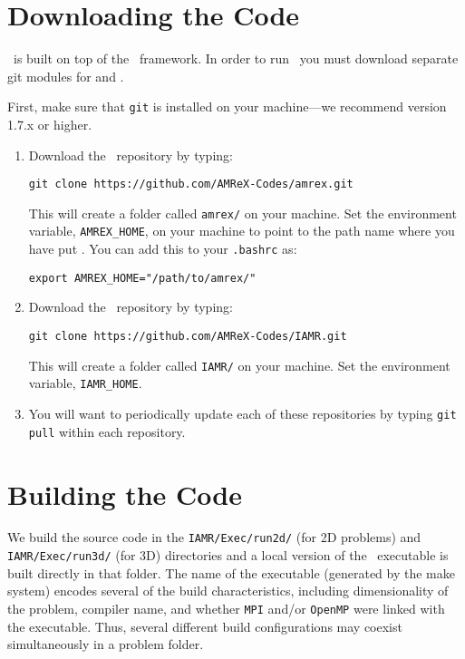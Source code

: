 
\section{Downloading the Code}

\iamr\ is built on top of the \amrex\ framework.  In order to run
\iamr\, you must download separate git modules for \iamr and \amrex.

\vspace{.1in}

\noindent First, make sure that {\tt git} is installed on your machine---we recommend version 1.7.x or higher.

\vspace{.1in}

\begin{enumerate}

\item Download the \amrex\ repository by typing: 
\begin{verbatim}
git clone https://github.com/AMReX-Codes/amrex.git
\end{verbatim}

This will create a folder called {\tt amrex/} on your machine.
Set the environment variable, {\tt AMREX\_HOME}, on your
machine to point to the path name where you have put \amrex.
You can add this to your {\tt .bashrc} as:
\begin{verbatim}
export AMREX_HOME="/path/to/amrex/"
\end{verbatim}

\item Download the \iamr\ repository by typing: 
\begin{verbatim}
git clone https://github.com/AMReX-Codes/IAMR.git
\end{verbatim}

This will create a folder called {\tt IAMR/} on your machine.
Set the environment variable, {\tt IAMR\_HOME}.

\item You will want to periodically update each of these repositories
by typing {\tt git pull} within each repository.

\end{enumerate}


\section{Building the Code}

We build the source code in the {\tt IAMR/Exec/run2d/} (for 2D problems) and {\tt IAMR/Exec/run3d/} 
(for 3D) directories and a local version of the 
\iamr\ executable is built directly in that folder.  The name of the executable (generated by the make
system) encodes several of the build characteristics, including dimensionality of the problem,
compiler name, and whether {\tt MPI} and/or {\tt OpenMP} were linked with the executable.
Thus, several different build configurations may coexist simultaneously in a problem folder.

